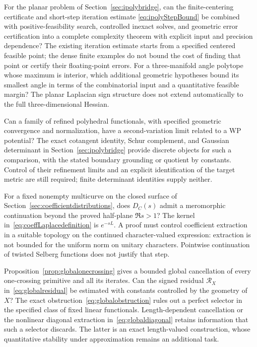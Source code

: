 \begin{question}
For the planar problem of Section~\ref{sec:ipolybridge}, can the
finite-centering certificate and short-step iteration estimate
\eqref{eq:ipolyStepBound} be combined with positive-feasibility search,
controlled inexact solves, and geometric error certification into a
complete complexity theorem with explicit input and precision dependence?
The existing iteration estimate starts from a specified centered
feasible point; the dense finite examples do not bound the cost of
finding that point or certify their floating-point errors.
For a three-manifold angle
polytope whose maximum is interior, which additional geometric hypotheses
bound its smallest angle in terms of the combinatorial input and a
quantitative feasible margin? The planar Laplacian sign structure does
not extend automatically to the full three-dimensional Hessian.
\end{question}

\begin{question}
Can a family of refined polyhedral functionals, with specified geometric
convergence and normalization, have a second-variation limit related to
a WP potential? The exact cotangent identity, Schur complement, and
Gaussian determinant in Section~\ref{sec:ipolybridge} provide discrete
objects for such a comparison, with the stated boundary grounding or
quotient by constants. Control of their refinement limits and an
explicit identification of the target metric are still required;
finite determinant identities supply neither.
\end{question}

\begin{question}
For a fixed nonempty multicurve on the closed surface of
Section~\ref{sec:coefficientdistributions}, does $D_C(s)$ admit a
meromorphic continuation beyond the proved half-plane $\Re s>1$?
The kernel in~\eqref{eq:coeffLaplacedefinition} is $e^{-sL}$.
A proof must control coefficient extraction in a suitable topology
on the continued character-valued expression: extraction is not
bounded for the uniform norm on unitary characters. Pointwise
continuation of twisted Selberg functions does not justify that step.
\end{question}

\begin{question}
Proposition~\ref{prop:globalonecrossing} gives a bounded global
cancellation of every one-crossing primitive and all its iterates.
Can the signed residual $\mathcal R_X$ in~\eqref{eq:globalresidual}
be estimated with constants controlled by the geometry of $X$?
The exact obstruction~\eqref{eq:globalobstruction} rules out a
perfect selector in the specified class of fixed linear functionals.
Length-dependent cancellation or the nonlinear diagonal extraction
in~\eqref{eq:globaldiagonal} retains information that such a selector
discards. The latter is an exact length-valued construction, whose
quantitative stability under approximation remains an additional task.
\end{question}

